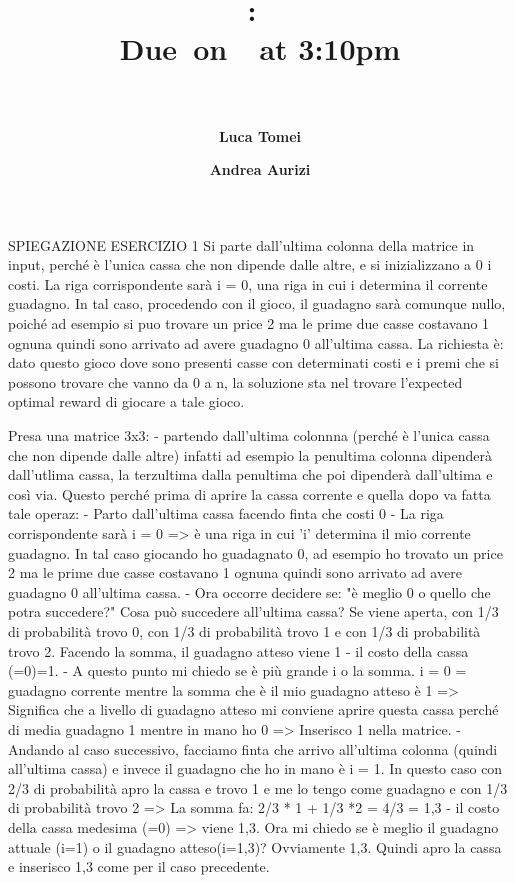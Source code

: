 \documentclass{article}
\title{
    \vspace{2in}
    \textmd{\textbf{\hmwkClass:\ \hmwkTitle}}\\
    \normalsize\vspace{0.1in}\small{Due\ on\ \hmwkDueDate\ at 3:10pm}\\
    \vspace{0.1in}\large{\textit{\hmwkClassInstructor\ \hmwkClassTime}}
    \vspace{3in}
}
\author{\textbf{Luca Tomei} \and \textbf{Andrea Aurizi}}
\date{}
\begin{document}
\maketitle

\pagebreak

\iffalse	SPIEGAZIONE ESERCIZIO 1
Si parte dall'ultima colonna della matrice in input, perché è l'unica cassa che non dipende dalle altre, e si inizializzano a 0 i costi.
La riga corrispondente sarà i = 0,  una riga in cui i determina il corrente guadagno. In tal caso, procedendo con il gioco, il guadagno sarà comunque nullo, poiché ad esempio si puo trovare 
un price 2 ma le prime due casse costavano 1 ognuna quindi sono arrivato
ad avere guadagno 0 all'ultima cassa.
La richiesta è: dato questo gioco dove sono presenti casse con determinati costi 
e i premi che si possono trovare che vanno da 0 a n, la soluzione sta nel trovare 
l'expected optimal reward di giocare a tale gioco.

Presa una matrice 3x3:
-   partendo dall'ultima colonnna (perché è l'unica cassa che non dipende dalle 
    altre) infatti ad esempio la penultima colonna dipenderà dall'utlima cassa,
    la terzultima dalla penultima che poi dipenderà dall'ultima e così via. Questo
    perché prima di aprire la cassa corrente e quella dopo va fatta tale operaz:
    -   Parto dall'ultima cassa facendo finta che costi 0
    -   La riga corrispondente sarà i = 0 => è una riga in cui 'i' determina il mio
        corrente guadagno. In tal caso giocando ho guadagnato 0, ad esempio ho trovato
        un price 2 ma le prime due casse costavano 1 ognuna quindi sono arrivato
        ad avere guadagno 0 all'ultima cassa.
    -   Ora occorre decidere se: "è meglio 0 o quello che potra succedere?"
        Cosa può succedere all'ultima cassa? Se viene aperta, con 1/3 di probabilità
        trovo 0, con 1/3 di probabilità trovo 1 e con 1/3 di probabilità trovo 2.
        Facendo la somma, il guadagno atteso viene 1 -  il costo della cassa (=0)=1.
    -   A questo punto mi chiedo se è più grande i o la somma. i = 0 = guadagno corrente
        mentre la somma che è il mio guadagno atteso è 1 => Significa che a livello di
        guadagno atteso mi conviene aprire questa cassa perché di media guadagno 1 mentre in mano
        ho 0 => Inserisco 1 nella matrice.
    -   Andando al caso successivo, facciamo finta che arrivo all'ultima colonna (quindi
        all'ultima cassa) e invece il guadagno che ho in mano è i = 1.
        In questo caso con 2/3 di probabilità apro la cassa e trovo 1 e me lo tengo
        come guadagno e con 1/3 di probabilità trovo 2
        => La somma fa: 2/3 * 1 + 1/3 *2 = 4/3 = 1,3 - il costo della cassa medesima (=0)
            => viene 1,3.
        Ora mi chiedo se è meglio il guadagno attuale (i=1) o il guadagno atteso(i=1,3)?
        Ovviamente 1,3. Quindi apro la cassa e inserisco 1,3 come per il caso precedente.
\end{document}
